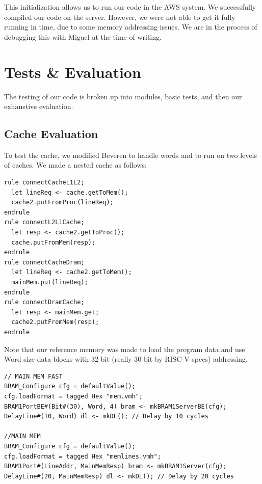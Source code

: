 \documentclass{article}
\begin{document}
This initialization allows us to run our code in the AWS system. We successfully compiled our code on the server. However, we were not able to get it fully running in time, due to some memory addressing issues. We are in the process of debugging this with Miguel at the time of writing. 



\section{Tests \& Evaluation}

The testing of our code is broken up into modules, basic tests, and then our exhaustive evaluation.

\subsection{Cache Evaluation}
To test the cache, we modified Beveren to handle words and to run on two levels of caches. We made a nested cache as follows:
\begin{lstlisting}
rule connectCacheL1L2;
  let lineReq <- cache.getToMem();
  cache2.putFromProc(lineReq);
endrule
rule connectL2L1Cache;
  let resp <- cache2.getToProc();
  cache.putFromMem(resp);
endrule
rule connectCacheDram;
  let lineReq <- cache2.getToMem();
  mainMem.put(lineReq);
endrule
rule connectDramCache;
  let resp <- mainMem.get;
  cache2.putFromMem(resp);
endrule
\end{lstlisting}
Note that our reference memory was made to load the program data and use Word size data blocks with 32-bit (really 30-bit by RISC-V specs) addressing.
\begin{lstlisting}
// MAIN MEM FAST
BRAM_Configure cfg = defaultValue();
cfg.loadFormat = tagged Hex "mem.vmh";
BRAM1PortBE#(Bit#(30), Word, 4) bram <- mkBRAM1ServerBE(cfg);
DelayLine#(10, Word) dl <- mkDL(); // Delay by 10 cycles

//MAIN MEM
BRAM_Configure cfg = defaultValue();
cfg.loadFormat = tagged Hex "memlines.vmh";
BRAM1Port#(LineAddr, MainMemResp) bram <- mkBRAM1Server(cfg);
DelayLine#(20, MainMemResp) dl <- mkDL(); // Delay by 20 cycles
\end{lstlisting}
\end{document}
